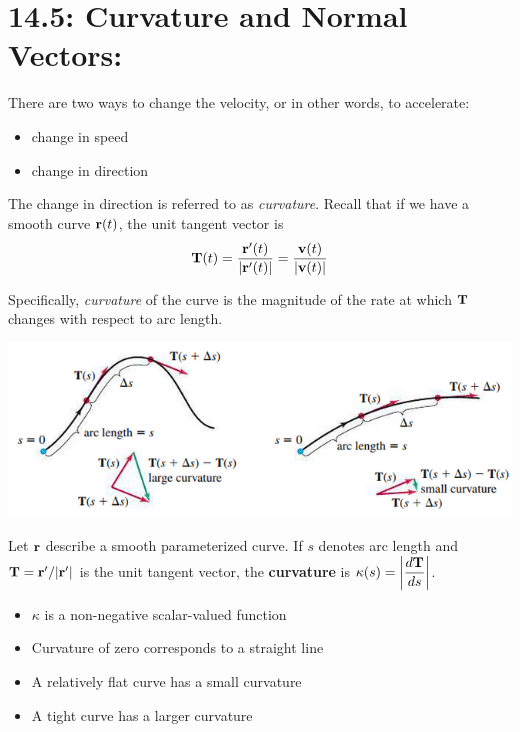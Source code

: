 \documentclass[mathNotesPreamble]{subfiles}
\begin{document}
\section{14.5: Curvature and Normal Vectors:}

  There are two ways to change the velocity, or in other words, to accelerate:
  \begin{itemize}
    \item 
      change in speed
    \item 
      change in direction 
  \end{itemize}
  The change in direction is referred to as \textit{curvature}. Recall that if we have a smooth curve ${\mathbf{r}}(t)$, the unit tangent vector is
    \[{\mathbf{T}}(t)=\frac{{\mathbf{r}}'(t)}{{\left\vert{\mathbf{r}}'(t)\right\vert}}=\frac{{\mathbf{v}}(t)}{{\left\vert{\mathbf{v}}(t)\right\vert}}\]

  Specifically, \textit{curvature} of the curve is the magnitude of the rate at which ${\mathbf{T}}$ changes with respect to arc length.

  \begin{center}
    \includegraphics[width=0.8\linewidth]{images/briggs_14_05/fig14_29}
  \end{center}

  \begin{defn*}[Curvature]
    Let ${\mathbf{r}}$ describe a smooth parameterized curve. If $s$ denotes arc length and ${\mathbf{T}}={\mathbf{r}}'/{\left\vert{\mathbf{r}}'\right\vert}$ is the unit tangent vector, the \textbf{curvature} is $\displaystyle\kappa(s)={\left\vert\frac{d{\mathbf{T}}}{ds}\right\vert}$.
  \end{defn*}
  \pagebreak

  \noindent
  \begin{itemize}
    \item 
      $\kappa$ is a non-negative scalar-valued function
    \item 
      Curvature of zero corresponds to a straight line
    \item 
      A relatively flat curve has a small curvature
    \item 
      A tight curve has a larger curvature
  \end{itemize}
\end{document}
